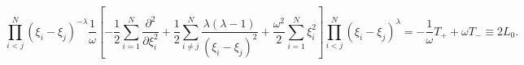 \begin{equation}
	\prod_{i<j}^{N}(\xi_{i}-\xi_{j})^{-\lambda}
	 \frac{1}{\omega}
	\left[
	- \frac{1}{2}
	\sum_{i=1}^{N}
		\frac {\partial ^{2}}{\partial \xi_{i}^2} +
		\frac{1}{2}
	\sum_{i\neq j}^{N}
	 	\frac {\lambda(\lambda-1)}{(\xi_{i}-\xi_{j})^{2}} +
		\frac{\omega^{2}}{2}
	\sum_{i=1}^{N}
		\xi_{i}^2
	\right]
	\prod_{i<j}^{N}(\xi_{i}-\xi_{j})^{\lambda} =
	-\frac{1}{\omega}T_{+} + \omega T_{-} \equiv 2L_{0}. 
\end{equation}

